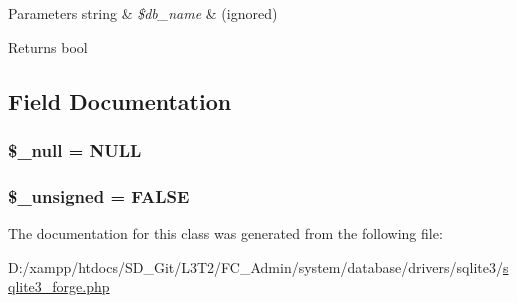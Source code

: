 \begin{DoxyParams}[1]{Parameters}
string & {\em \$db\+\_\+name} & (ignored) \\
\hline
\end{DoxyParams}
\begin{DoxyReturn}{Returns}
bool 
\end{DoxyReturn}


\subsection{Field Documentation}
\hypertarget{class_c_i___d_b__sqlite3__forge_ae58fe6a5104d4a069a49b27533ce808f}{}
\subsubsection[{\$\+\_\+null}]{\setlength{\rightskip}{0pt plus 5cm}\$\+\_\+null = \textquotesingle{}N\+U\+L\+L\textquotesingle{}\hspace{0.3cm}{\ttfamily [protected]}}\label{class_c_i___d_b__sqlite3__forge_ae58fe6a5104d4a069a49b27533ce808f}
\hypertarget{class_c_i___d_b__sqlite3__forge_aae977ae6d61fa183f0b25422b6ddc31c}{}
\subsubsection[{\$\+\_\+unsigned}]{\setlength{\rightskip}{0pt plus 5cm}\$\+\_\+unsigned = F\+A\+L\+S\+E\hspace{0.3cm}{\ttfamily [protected]}}\label{class_c_i___d_b__sqlite3__forge_aae977ae6d61fa183f0b25422b6ddc31c}


The documentation for this class was generated from the following file\+:\begin{DoxyCompactItemize}
\item 
D\+:/xampp/htdocs/\+S\+D\+\_\+\+Git/\+L3\+T2/\+F\+C\+\_\+\+Admin/system/database/drivers/sqlite3/\hyperlink{sqlite3__forge_8php}{sqlite3\+\_\+forge.\+php}\end{DoxyCompactItemize}
